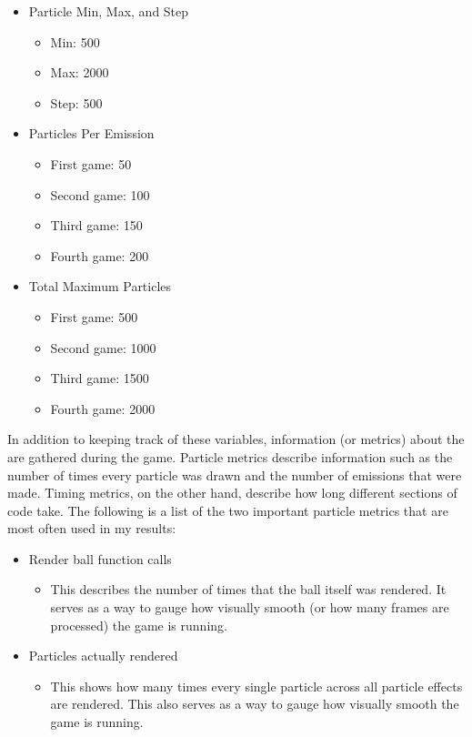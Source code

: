 \begin{itemize}[nolistsep,topsep=0pt]

	\item Particle Min, Max, and Step 
		\begin{itemize}[nolistsep,topsep=0pt]
			\item Min: 500
			\item Max: 2000
			\item Step: 500
		\end{itemize}

	\item Particles Per Emission
		\begin{itemize}[nolistsep,topsep=0pt]
			\item First game: 50
			\item Second game: 100
			\item Third game: 150
			\item Fourth game: 200
		\end{itemize}

	\item Total Maximum Particles
		\begin{itemize}[nolistsep,topsep=0pt]
			\item First game: 500
			\item Second game: 1000
			\item Third game: 1500
			\item Fourth game: 2000
		\end{itemize}

\end{itemize}

In addition to keeping track of these variables, information (or metrics) about the  are gathered during the game. Particle metrics describe information such as the number of times every particle was drawn and the number of emissions that were made. Timing metrics, on the other hand, describe how long different sections of code take. The following is a list of the two important particle metrics that are most often used in my results:


\begin{itemize}[nolistsep,topsep=0pt]

	\item Render ball function calls
		\begin{itemize}[nolistsep,topsep=0pt]
			\item This describes the number of times that the ball itself was rendered. It serves as a way to gauge how visually smooth (or how many frames are processed) the game is running.
		\end{itemize}

	\item Particles actually rendered
		\begin{itemize}[nolistsep,topsep=0pt]
			\item This shows how many times every single particle across all particle effects are rendered. This also serves as a way to gauge how visually smooth the game is running.
		\end{itemize}

\end{itemize}

